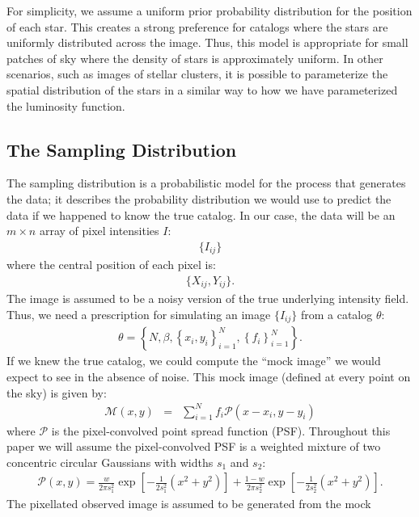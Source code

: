 \documentclass[12pt, preprint]{aastex}
\begin{document}
For simplicity, we assume a uniform prior probability distribution for the
position of each star. This creates a strong preference for catalogs where
the stars are uniformly distributed across the image. Thus, this model is
appropriate for small patches of sky where the density of stars is approximately
uniform. In other scenarios, such as images of stellar clusters, it is possible
to parameterize the spatial distribution of the stars in a similar way to how
we have parameterized the luminosity function.

\subsection{The Sampling Distribution}
The sampling distribution is a probabilistic model for the process that
generates the data; it describes the probability distribution we would use
to predict the data if we happened to know the true catalog. In our case,
the data will be an $m \times n$ array of pixel intensities $I$:
\begin{eqnarray}
\{I_{ij}\}
\end{eqnarray}
where the central position of each pixel is:
\begin{eqnarray}
\{X_{ij}, Y_{ij}\}.
\end{eqnarray}
The image is assumed to be a noisy version of the true underlying intensity
field. Thus, we need
a prescription for simulating an image $\{I_{ij}\}$ from a catalog $\theta$:
\begin{eqnarray}
\theta = \left\{N, \beta, \left\{x_i, y_i\right\}_{i=1}^N,
\left\{f_i\right\}_{i=1}^N\right\}.
\end{eqnarray}
If we knew the true catalog, we could compute the
``mock image'' we would expect to see
in the absence of noise. This mock image (defined at every point on the sky)
is given by:
\begin{eqnarray}
\mathcal{M}(x, y) &=& \sum_{i=1}^N f_i \mathcal{P}(x - x_i, y - y_i)
\end{eqnarray}
where $\mathcal{P}$ is the pixel-convolved point spread function (PSF).
Throughout this paper we will
assume the pixel-convolved PSF is a weighted mixture of two concentric
circular
Gaussians with widths $s_1$ and $s_2$:
\begin{eqnarray}
\mathcal{P}(x, y) = \frac{w}{2\pi s_1^2}\exp
\left[
-\frac{1}{2s_1^2}\left(x^2 + y^2\right)
\right]
+ \frac{1-w}{2\pi s_2^2}\exp
\left[-\frac{1}{2s_2^2}\left(x^2 + y^2\right)
\right].
\end{eqnarray}
The pixellated observed image is assumed to be generated from the mock
\end{document}
